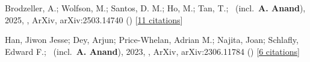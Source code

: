 \item[{\color{numcolor}\scriptsize2}] Brodzeller, A.; Wolfson, M.; Santos, D. M.; Ho, M.; Tan, T.; \etal\ (incl.\ \textbf{A. Anand}), 2025, , ArXiv, arXiv:2503.14740 () [\href{https://ui.adsabs.harvard.edu/abs/2025arXiv250314740B}{11 citations}]

\item[{\color{numcolor}\scriptsize1}] Han, Jiwon Jesse; Dey, Arjun; Price-Whelan, Adrian M.; Najita, Joan; Schlafly, Edward F.; \etal\ (incl.\ \textbf{A. Anand}), 2023, , ArXiv, arXiv:2306.11784 () [\href{https://ui.adsabs.harvard.edu/abs/2023arXiv230611784H}{6 citations}]